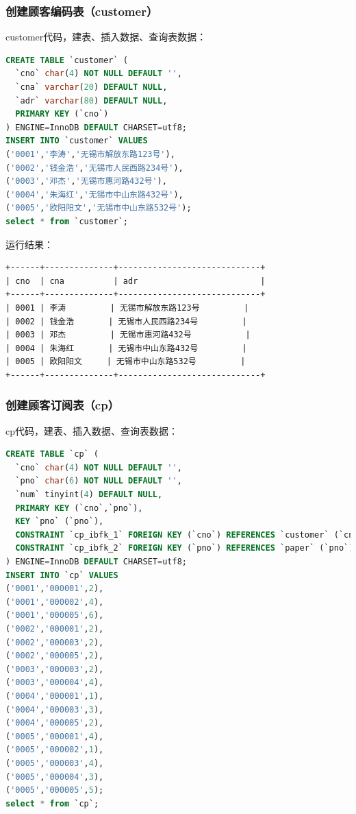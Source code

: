 \documentclass[hyperref,UTF8,c5size]{ctexart}
\begin{document}
            \subsubsection{创建顾客编码表（customer）}
                customer代码，建表、插入数据、查询表数据：
			        \begin{lstlisting}[language=SQL]
CREATE TABLE `customer` (
  `cno` char(4) NOT NULL DEFAULT '',
  `cna` varchar(20) DEFAULT NULL,
  `adr` varchar(80) DEFAULT NULL,
  PRIMARY KEY (`cno`)
) ENGINE=InnoDB DEFAULT CHARSET=utf8;
INSERT INTO `customer` VALUES 
('0001','李涛','无锡市解放东路123号'),
('0002','钱金浩','无锡市人民西路234号'),
('0003','邓杰','无锡市惠河路432号'),
('0004','朱海红','无锡市中山东路432号'),
('0005','欧阳阳文','无锡市中山东路532号');
select * from `customer`;
			        \end{lstlisting}

                    运行结果：
		            \begin{lstlisting}
+------+--------------+-----------------------------+
| cno  | cna          | adr                         |
+------+--------------+-----------------------------+
| 0001 | 李涛         | 无锡市解放东路123号         |
| 0002 | 钱金浩       | 无锡市人民西路234号         |
| 0003 | 邓杰         | 无锡市惠河路432号           |
| 0004 | 朱海红       | 无锡市中山东路432号         |
| 0005 | 欧阳阳文     | 无锡市中山东路532号         |
+------+--------------+-----------------------------+
		            \end{lstlisting}

            \subsubsection{创建顾客订阅表（cp）}
                cp代码，建表、插入数据、查询表数据：
			        \begin{lstlisting}[language=SQL]
CREATE TABLE `cp` ( 
  `cno` char(4) NOT NULL DEFAULT '',
  `pno` char(6) NOT NULL DEFAULT '',
  `num` tinyint(4) DEFAULT NULL,
  PRIMARY KEY (`cno`,`pno`),
  KEY `pno` (`pno`),
  CONSTRAINT `cp_ibfk_1` FOREIGN KEY (`cno`) REFERENCES `customer` (`cno`),
  CONSTRAINT `cp_ibfk_2` FOREIGN KEY (`pno`) REFERENCES `paper` (`pno`) 
) ENGINE=InnoDB DEFAULT CHARSET=utf8;
INSERT INTO `cp` VALUES 
('0001','000001',2),
('0001','000002',4),
('0001','000005',6),
('0002','000001',2),
('0002','000003',2),
('0002','000005',2),
('0003','000003',2),
('0003','000004',4),
('0004','000001',1),
('0004','000003',3),
('0004','000005',2),
('0005','000001',4),
('0005','000002',1),
('0005','000003',4),
('0005','000004',3),
('0005','000005',5);
select * from `cp`;
			        \end{lstlisting}
\end{document}
